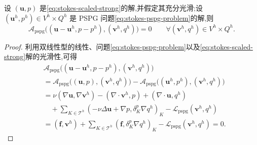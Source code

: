 \begin{lemma}\label{lem:stokes-pspg-galerkin-orthogonality}
设 $(\bm{u},p)$ 是\cref{eq:stokes-scaled-strong}的解,并假定其充分光滑;设 $(\bm{u}^h,p^h)\in V^h\times Q^h$ 是 PSPG 问题\cref{eq:stokes-pspg-problem}的解,则
\begin{equation}\label{eq:stokes-pspg-galerkin-orthogonality}
 \mathcal{A}_{\mathrm{pspg}}\bigl((\bm{u}-\bm{u}^h,p-p^h),
              (\bm{v}^h,q^h)\bigr)=0
 \qquad\forall(\bm{v}^h,q^h)\in V^h\times Q^h.
\end{equation}
\end{lemma}
\begin{proof}
利用双线性型的线性、问题\cref{eq:stokes-pspg-problem}以及\cref{eq:stokes-scaled-strong}解的光滑性,可得
\[
\begin{aligned}
 &\mathcal{A}_{\mathrm{pspg}}\bigl((\bm{u}-\bm{u}^h,p-p^h),
                 (\bm{v}^h,q^h)\bigr)\\
 &=\mathcal{A}_{\mathrm{pspg}}\bigl((\bm{u},p),(\bm{v}^h,q^h)\bigr)
  -\mathcal{A}_{\mathrm{pspg}}\bigl((\bm{u}^h,p^h),(\bm{v}^h,q^h)\bigr)\\
 &=\nu(\nabla\bm{u},\nabla\bm{v}^h)
   -(\nabla\cdot\bm{v}^h,p)
   +(\nabla\cdot\bm{u},q^h)\\
 &\quad+\sum_{K\in\mathcal{T}^h}
    (-\nu\Delta\bm{u}+\nabla p,\delta_K^p\nabla q^h)_K
   -\mathcal{L}_{\mathrm{pspg}}(\bm{v}^h,q^h)\\
 &= (\bm{f},\bm{v}^h)
   +\sum_{K\in\mathcal{T}^h}(\bm{f},\delta_K^p\nabla q^h)_K
   -\mathcal{L}_{\mathrm{pspg}}(\bm{v}^h,q^h)=0.
\end{aligned}
\]
\end{proof}

